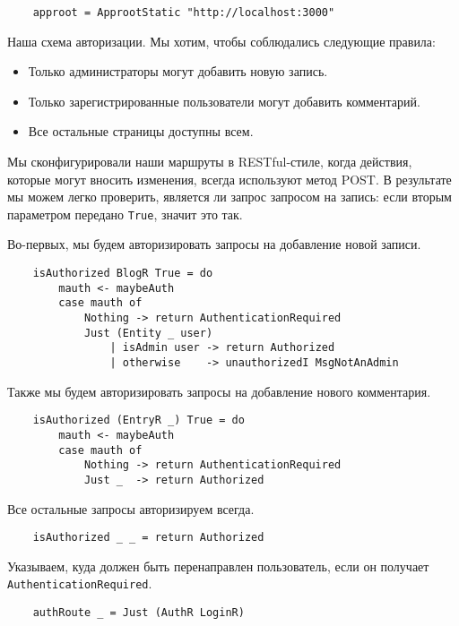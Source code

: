 \begin{lstlisting}
    approot = ApprootStatic "http://localhost:3000"
\end{lstlisting}
 
Наша схема авторизации. Мы хотим, чтобы соблюдались следующие правила:

\begin{itemize}
\item Только администраторы могут добавить новую запись. 
\item Только зарегистрированные пользователи могут добавить комментарий. 
\item Все остальные страницы доступны всем.
\end{itemize}

Мы сконфигурировали наши маршруты в RESTful-стиле, когда действия, которые могут вносить изменения, всегда используют метод POST. В результате мы можем легко проверить, является ли запрос запросом на запись: если вторым параметром передано \lstinline!True!, значит это так.

Во-первых, мы будем авторизировать запросы на добавление новой записи. 
 
\begin{lstlisting}
    isAuthorized BlogR True = do
        mauth <- maybeAuth
        case mauth of
            Nothing -> return AuthenticationRequired
            Just (Entity _ user)
                | isAdmin user -> return Authorized
                | otherwise    -> unauthorizedI MsgNotAnAdmin
\end{lstlisting}

Также мы будем авторизировать запросы на добавление нового комментария. 
 
\begin{lstlisting}
    isAuthorized (EntryR _) True = do
        mauth <- maybeAuth
        case mauth of
            Nothing -> return AuthenticationRequired
            Just _  -> return Authorized
\end{lstlisting}
 
Все остальные запросы авторизируем всегда.
 
\begin{lstlisting}
    isAuthorized _ _ = return Authorized
\end{lstlisting}
 
Указываем, куда должен быть перенаправлен пользователь, если он получает \lstinline!AuthenticationRequired!. 
 
\begin{lstlisting}
    authRoute _ = Just (AuthR LoginR)
\end{lstlisting}
 
